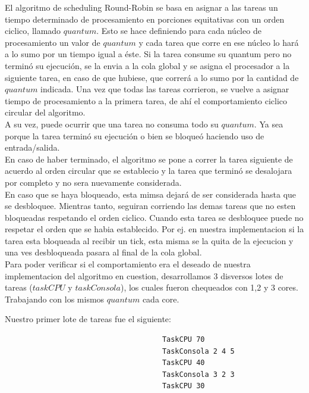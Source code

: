 \indent El algoritmo de scheduling Round-Robin se basa en asignar a las tareas un tiempo determinado de procesamiento en porciones equitativas  con un orden ciclico, llamado
$quantum$. 
Esto se hace definiendo para cada núcleo de procesamiento un valor de $quantum$ y cada tarea que corre en ese núcleo lo hará a lo sumo por un tiempo igual a éste. 
Si la tarea consume su quantum pero no terminó su ejecución, se la envia a la cola global y se asigna el procesador a la siguiente tarea, en 
caso de que hubiese, que correrá a lo sumo por la cantidad de $quantum$ indicada. 
Una vez que todas las tareas corrieron, se vuelve a asignar tiempo de procesamiento a la primera tarea, 
de ahí el comportamiento ciclico circular del algoritmo.\\
\indent A su vez, puede ocurrir que una tarea no consuma todo su $quantum$. Ya sea porque 
la tarea terminó su ejecución o bien se bloqueó haciendo uso de entrada/salida.\\
\indent En caso de haber terminado, el algoritmo se pone a correr la tarea siguiente de acuerdo al orden circular que se 
establecio y la tarea que terminó se desalojara por completo y no sera nuevamente considerada.\\
\indent En caso que se haya bloqueado, esta mimsa dejará de ser considerada hasta que se desbloquee. Mientras tanto,
seguiran corriendo las demas tareas que no esten bloqueadas respetando el orden ciclico.
Cuando esta tarea se desbloquee puede no respetar el orden que se habia establecido. Por ej. en nuestra implementacion
si la tarea esta bloqueada al recibir un tick, esta misma se la quita de la ejecucion y una ves desbloqueada pasara al final de
la cola global.\\

\indent Para poder verificar si el comportamiento era el deseado de nuestra implementacion del algoritmo en cuestion, 
desarrollamos 3 disversos lotes de tareas ($taskCPU$ y $taskConsola$), los cuales fueron chequeados con 1,2 y 3 cores.\\
Trabajando con los mismos $quantum$ cada core.
\indent

Nuestro primer lote de tareas fue el siguiente:
\begin{verbatim}
                                     TaskCPU 70
                                     TaskConsola 2 4 5
                                     TaskCPU 40
                                     TaskConsola 3 2 3
                                     TaskCPU 30
\end{verbatim}

